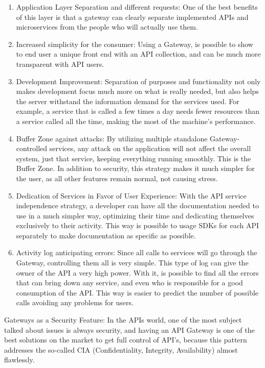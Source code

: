 \begin{enumerate}
\item Application Layer Separation and different requests:
One of the best benefits of this layer is that a gateway can clearly separate implemented APIs and microservices from the people who will actually use them.
\item Increased simplicity for the consumer: Using a Gateway, is possible to show to end user a unique front end with an API collection, and can be much more transparent with API users.
\item Development Improvement: Separation of purposes and functionality not only makes development focus much more on what is really needed, but also helps the server withstand the information demand for the services used. For example, a service that is called a few times a day needs fewer resources than a service called all the time, making the most of the machine's performance.

\item Buffer Zone against attacks: By utilizing multiple standalone Gateway-controlled services, any attack on the application will not affect the overall system, just that service, keeping everything running smoothly. This is the Buffer Zone. In addition to security, this strategy makes it much simpler for the user, as all other features remain normal, not causing stress.

\item Dedication of Services in Favor of User Experience: With the API service independence strategy, a developer can have all the documentation needed to use in a much simpler way, optimizing their time and dedicating themselves exclusively to their activity. This way is possible to usage SDKs for each API separately to make documentation as specific as possible.

\item Activity log anticipating errors: Since all calls to services will go through the Gateway, controlling them all is very simple. This type of log can give the owner of the API a very high power. With it, is possible to find all the errors that can bring down any service, and even who is responsible for a good consumption of the API. This way is easier to predict the number of possible calls avoiding any problems for users.

\end{enumerate}

Gateways as a Security Feature: In the APIs world, one of the most subject talked about issues is always security, and having an API Gateway is one of the best solutions on the market to get full control of API’s, because this pattern addresses the so-called CIA (Confidentiality, Integrity, Availability) almost flawlessly.


